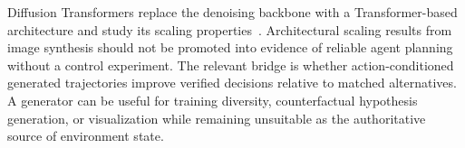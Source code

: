 Diffusion Transformers replace the denoising backbone with a Transformer-based architecture and study its scaling properties~\cite{peebles2022dit}. Architectural scaling results from image synthesis should not be promoted into evidence of reliable agent planning without a control experiment. The relevant bridge is whether action-conditioned generated trajectories improve verified decisions relative to matched alternatives. A generator can be useful for training diversity, counterfactual hypothesis generation, or visualization while remaining unsuitable as the authoritative source of environment state.

